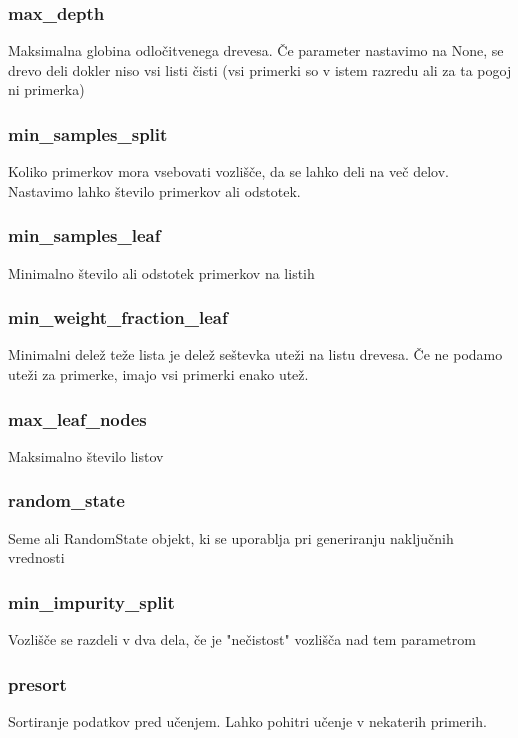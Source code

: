 \documentclass[a4paper,11pt]{article}
\begin{document}
\subsubsection{max_depth}
Maksimalna globina odločitvenega drevesa. Če parameter nastavimo na None, se drevo deli dokler niso vsi listi čisti (vsi primerki so v istem razredu ali za ta pogoj ni primerka)

\subsubsection{min_samples_split}
Koliko primerkov mora vsebovati vozlišče, da se lahko deli na več delov. Nastavimo lahko število primerkov ali odstotek.

\subsubsection{min_samples_leaf}
Minimalno število ali odstotek primerkov na listih

\subsubsection{min_weight_fraction_leaf}
Minimalni delež teže lista je delež seštevka uteži na listu drevesa. Če ne podamo uteži za primerke, imajo vsi primerki enako utež.

\subsubsection{max_leaf_nodes}
Maksimalno število listov

\subsubsection{random_state}
Seme ali RandomState objekt, ki se uporablja pri generiranju naključnih vrednosti

\subsubsection{min_impurity_split}
Vozlišče se razdeli v dva dela, če je "nečistost" vozlišča nad tem parametrom

\subsubsection{presort}
Sortiranje podatkov pred učenjem. Lahko pohitri učenje v nekaterih primerih.
\end{document}
